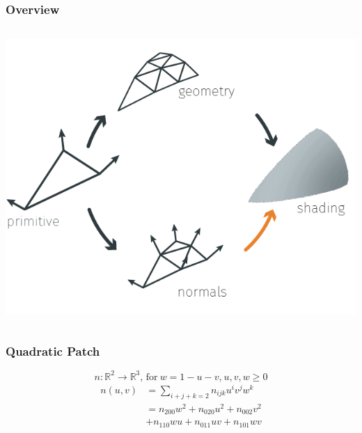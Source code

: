 




\begin{frame}\frametitle{Overview}
	\begin{columns}
		\begin{column}{0.9\textwidth}
			\begin{center}
				\includegraphics[width=\textwidth]{./img/1_single/recap_normalsToShading.png}
			\end{center}		
		\end{column}
	\end{columns}
\end{frame}	


\begin{frame}\frametitle{Quadratic Patch}
	\begin{equation*}
		n: \mathbb{R}^2 \rightarrow \mathbb{R}^3 \text{, for}\ w = 1 - u - v \text{,}\ u, v, w \geq 0 
	\end{equation*}
	\begin{equation*}
		\begin{aligned}
		n(u,v) & = \sum\limits_{i+j+k=2} n_{ijk} u^i v^j w^k\\
		& = n_{200} w^2 + n_{020} u^2 + n_{002} v^2\\
		& + n_{110} w u + n_{011} u v + n_{101} w v
		\end{aligned}
	\end{equation*}
\end{frame}	

